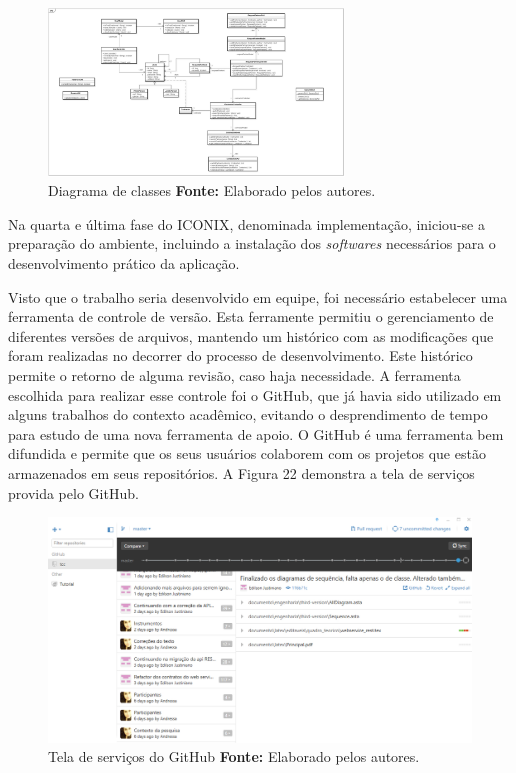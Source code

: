 \begin{figure}[h!]
	\centerline{\includegraphics[angle=90,height=0.7\textheight,width=0.7\textwidth]{./imagens/classe.jpg}}
	\caption[Diagrama de classes]
	{Diagrama de classes \textbf{Fonte:} Elaborado pelos autores.}
	\label{fig:exemplo1}
\end{figure}

\newpage
\par Na quarta e última fase do ICONIX, denominada implementação, iniciou-se a preparação do ambiente, incluindo a instalação dos \textit{softwares} necessários para o desenvolvimento prático da aplicação.

\par Visto que o trabalho seria desenvolvido em equipe, foi necessário estabelecer uma ferramenta de controle de versão. Esta ferramente permitiu o gerenciamento de diferentes versões de arquivos, mantendo um histórico com as modificações que foram realizadas no decorrer do processo de desenvolvimento. Este histórico permite o retorno de alguma revisão, caso haja necessidade. A ferramenta escolhida para realizar esse controle foi o GitHub, que já havia sido utilizado em alguns trabalhos do contexto acadêmico, evitando o desprendimento de tempo para estudo de uma nova ferramenta de apoio. O GitHub é uma ferramenta bem difundida e permite que os seus usuários colaborem com os projetos que estão armazenados em seus repositórios\footnotemark[31]. A Figura 22 demonstra a tela de serviços provida pelo GitHub.


\begin{figure}[h!]
	\centerline{\includegraphics[scale=0.35]{./imagens/github.jpg}}
	\caption[Tela de serviços do GitHub ]
	{Tela de serviços do GitHub \textbf{Fonte:} Elaborado pelos autores.}
	\label{fig:exemplo1}
\end{figure}

